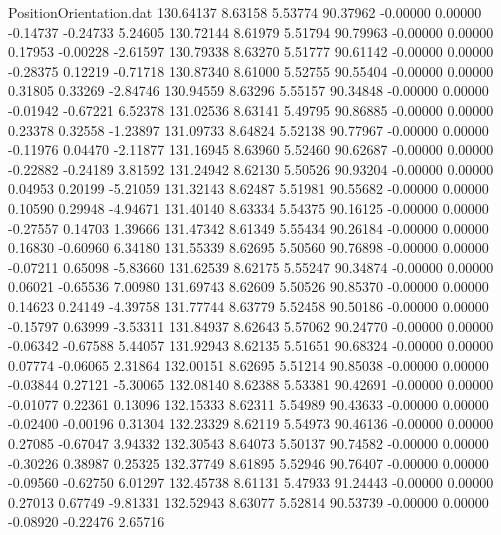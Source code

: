 \begin{filecontents}{PositionOrientation.dat}
 130.64137    8.63158    5.53774    90.37962   -0.00000    0.00000   -0.14737   -0.24733    5.24605
 130.72144    8.61979    5.51794    90.79963   -0.00000    0.00000    0.17953   -0.00228   -2.61597
 130.79338    8.63270    5.51777    90.61142   -0.00000    0.00000   -0.28375    0.12219   -0.71718
 130.87340    8.61000    5.52755    90.55404   -0.00000    0.00000    0.31805    0.33269   -2.84746
 130.94559    8.63296    5.55157    90.34848   -0.00000    0.00000   -0.01942   -0.67221    6.52378
 131.02536    8.63141    5.49795    90.86885   -0.00000    0.00000    0.23378    0.32558   -1.23897
 131.09733    8.64824    5.52138    90.77967   -0.00000    0.00000   -0.11976    0.04470   -2.11877
 131.16945    8.63960    5.52460    90.62687   -0.00000    0.00000   -0.22882   -0.24189    3.81592
 131.24942    8.62130    5.50526    90.93204   -0.00000    0.00000    0.04953    0.20199   -5.21059
 131.32143    8.62487    5.51981    90.55682   -0.00000    0.00000    0.10590    0.29948   -4.94671
 131.40140    8.63334    5.54375    90.16125   -0.00000    0.00000   -0.27557    0.14703    1.39666
 131.47342    8.61349    5.55434    90.26184   -0.00000    0.00000    0.16830   -0.60960    6.34180
 131.55339    8.62695    5.50560    90.76898   -0.00000    0.00000   -0.07211    0.65098   -5.83660
 131.62539    8.62175    5.55247    90.34874   -0.00000    0.00000    0.06021   -0.65536    7.00980
 131.69743    8.62609    5.50526    90.85370   -0.00000    0.00000    0.14623    0.24149   -4.39758
 131.77744    8.63779    5.52458    90.50186   -0.00000    0.00000   -0.15797    0.63999   -3.53311
 131.84937    8.62643    5.57062    90.24770   -0.00000    0.00000   -0.06342   -0.67588    5.44057
 131.92943    8.62135    5.51651    90.68324   -0.00000    0.00000    0.07774   -0.06065    2.31864
 132.00151    8.62695    5.51214    90.85038   -0.00000    0.00000   -0.03844    0.27121   -5.30065
 132.08140    8.62388    5.53381    90.42691   -0.00000    0.00000   -0.01077    0.22361    0.13096
 132.15333    8.62311    5.54989    90.43633   -0.00000    0.00000   -0.02400   -0.00196    0.31304
 132.23329    8.62119    5.54973    90.46136   -0.00000    0.00000    0.27085   -0.67047    3.94332
 132.30543    8.64073    5.50137    90.74582   -0.00000    0.00000   -0.30226    0.38987    0.25325
 132.37749    8.61895    5.52946    90.76407   -0.00000    0.00000   -0.09560   -0.62750    6.01297
 132.45738    8.61131    5.47933    91.24443   -0.00000    0.00000    0.27013    0.67749   -9.81331
 132.52943    8.63077    5.52814    90.53739   -0.00000    0.00000   -0.08920   -0.22476    2.65716

\end{filecontents}
